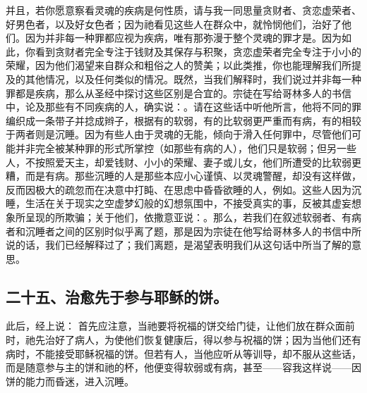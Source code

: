 并且，若你愿意察看灵魂的疾病是何性质，请与我一同思量贪财者、贪恋虚荣者、好男色者，以及好女色者；因为祂看见这些人在群众中，就怜悯他们，治好了他们。因为并非每一种罪都应视为疾病，唯有那弥漫于整个灵魂的罪才是。因为如此，你看到贪财者完全专注于钱财及其保存与积聚，贪恋虚荣者完全专注于小小的荣耀，因为他们渴望来自群众和粗俗之人的赞美；以此类推，你也能理解我们所提及的其他情况，以及任何类似的情况。既然，当我们解释时，我们说过并非每一种罪都是疾病，那么从圣经中探讨这些区别是合宜的。宗徒在写给哥林多人的书信中，论及那些有不同疾病的人，确实说：。请在这些话中听他所言，他将不同的罪编织成一条带子并捻成辫子，根据有的软弱，有的比软弱更严重而有病，有的相较于两者则是沉睡。因为有些人由于灵魂的无能，倾向于滑入任何罪中，尽管他们可能并非完全被某种罪的形式所掌控（如那些有病的人），他们只是软弱；但另一些人，不按照爱天主，却爱钱财、小小的荣耀、妻子或儿女，他们所遭受的比软弱更糟，而是有病。那些沉睡的人是那些本应小心谨慎、以灵魂警醒，却没有这样做，反而因极大的疏忽而在决意中打盹、在思虑中昏昏欲睡的人，例如。这些人因为沉睡，生活在关于现实之空虚梦幻般的幻想氛围中，不接受真实的事，反被其虚妄想象所呈现的所欺骗；关于他们，依撒意亚说：。那么，若我们在叙述软弱者、有病者和沉睡者之间的区别时似乎离了题，那是因为宗徒在他写给哥林多人的书信中所说的话，我们已经解释过了；我们离题，是渴望表明我们从这句话中所当了解的意思。\par


\subsection{二十五、治愈先于参与耶稣的饼。}

此后，经上说： 首先应注意，当祂要将祝福的饼交给门徒，让他们放在群众面前时，祂先治好了病人，为使他们恢复健康后，得以参与祝福的饼；因为当他们还有病时，不能接受耶稣祝福的饼。但若有人，当他应听从等训导，却不服从这些话，而是随意参与主的饼和祂的杯，他便变得软弱或有病，甚至——容我这样说——因饼的能力而昏迷，进入沉睡。\par

